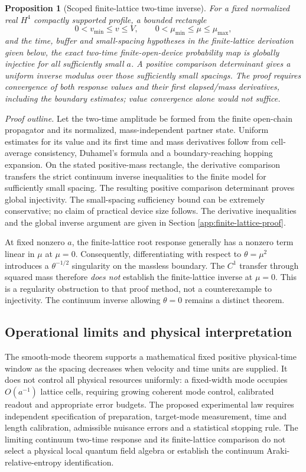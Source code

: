 \documentclass[11pt]{article}
\newtheorem{proposition}[theorem]{Proposition}
\theoremstyle{definition}
\begin{document}
\begin{proposition}[Scoped finite-lattice two-time inverse]
\label{prop:twotime-finite-lattice-inverse}
For a fixed normalized real $H^4$ compactly supported profile, a bounded
rectangle
\[
 0<v_{\min}\le v\le V,\qquad
 0<\mu_{\min}\le\mu\le\mu_{\max},
\]
and the time, buffer and small-spacing hypotheses in the finite-lattice derivation given below, the \emph{exact} two-time finite-open-device
probability map is globally injective for all sufficiently small $a$.
A positive comparison determinant gives a uniform inverse modulus over
those sufficiently small spacings. The proof requires convergence of both
response values and their first elapsed/mass derivatives, including the
boundary estimates; value convergence alone would not suffice.
\end{proposition}
\noindent
\emph{Proof outline.} Let the two-time amplitude be formed from the
finite open-chain propagator and its normalized, mass-independent partner
state. Uniform estimates for its value and its first time and mass
derivatives follow from cell-average consistency, Duhamel's formula and
a boundary-reaching hopping expansion. On the stated positive-mass
rectangle, the derivative comparison transfers the strict continuum
inverse inequalities to the finite model for sufficiently small spacing.
The resulting positive comparison determinant proves global injectivity.
The small-spacing sufficiency bound can be extremely conservative; no
claim of practical device size follows. The derivative inequalities and the global inverse argument are given in
Section \ref{app:finite-lattice-proof}.

At fixed nonzero $a$, the finite-lattice root response generally has a
nonzero term linear in $\mu$ at $\mu=0$. Consequently, differentiating
with respect to $\theta=\mu^2$ introduces a $\theta^{-1/2}$ singularity
on the massless boundary. The $C^1$ transfer through squared mass
therefore \emph{does not} establish the finite-lattice inverse at
$\mu=0$. This is a regularity obstruction to that proof method, not a
counterexample to injectivity. The continuum inverse allowing
$\theta=0$ remains a distinct theorem.

\subsection{Operational limits and physical interpretation}
The smooth-mode theorem supports a mathematical fixed positive physical-time
window as the spacing decreases when velocity and time units are supplied.
It does not control all physical resources uniformly: a fixed-width mode
occupies $O(a^{-1})$ lattice cells, requiring growing coherent mode control,
calibrated readout and appropriate error budgets. The proposed experimental
law requires independent specification of preparation, target-mode
measurement, time and length calibration, admissible nuisance errors and a
statistical stopping rule. The limiting continuum two-time response and its
finite-lattice comparison do not select a physical local quantum field
algebra or establish the continuum Araki-relative-entropy identification.
\end{document}
